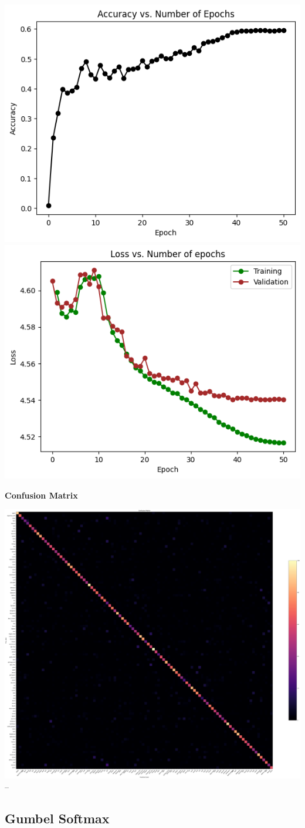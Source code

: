\documentclass{article}
\begin{document}
        \includegraphics[width=0.5\linewidth]{images/LogSoftmax/logsoftmax-accepoch.png}
        \includegraphics[width=0.5\linewidth]{images/LogSoftmax/logsoftmax-lossepoch.png}

\textbf{Confusion Matrix}

\includegraphics[width=0.9\linewidth]{images/LogSoftmax/highres-logsoftmax.png}
--

\subsection{Gumbel Softmax}
\end{document}
